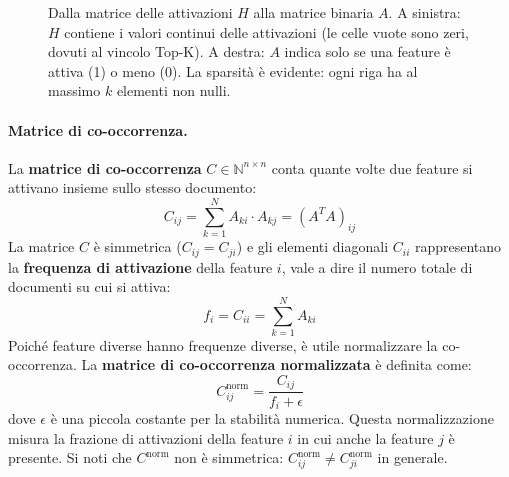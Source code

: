\begin{figure}[htbp]
    \caption{Dalla matrice delle attivazioni $H$ alla matrice binaria $A$. A sinistra: $H$ contiene i valori continui delle attivazioni (le celle vuote sono zeri, dovuti al vincolo Top-K). A destra: $A$ indica solo se una feature è attiva (1) o meno (0). La sparsità è evidente: ogni riga ha al massimo $k$ elementi non nulli.}
    \label{fig:H_to_A}
\end{figure}

\paragraph{Matrice di co-occorrenza.} La \textbf{matrice di co-occorrenza} $C \in \mathbb{N}^{n \times n}$ conta quante volte due feature si attivano insieme sullo stesso documento:
\begin{equation}
    C_{ij} = \sum_{k=1}^{N} A_{ki} \cdot A_{kj} = \left( A^T A \right)_{ij}
    \label{eq:cooccurrence}
\end{equation}
La matrice $C$ è simmetrica ($C_{ij} = C_{ji}$) e gli elementi diagonali $C_{ii}$ rappresentano la \textbf{frequenza di attivazione} della feature $i$, vale a dire il numero totale di documenti su cui si attiva:
\begin{equation}
    f_i = C_{ii} = \sum_{k=1}^{N} A_{ki}
    \label{eq:activation_frequency}
\end{equation}
Poiché feature diverse hanno frequenze diverse, è utile normalizzare la co-occorrenza. La \textbf{matrice di co-occorrenza normalizzata} è definita come:
\begin{equation}
    C^{\text{norm}}_{ij} = \frac{C_{ij}}{f_i + \epsilon}
    \label{eq:cooccurrence_norm}
\end{equation}
dove $\epsilon$ è una piccola costante per la stabilità numerica. Questa normalizzazione misura la frazione di attivazioni della feature $i$ in cui anche la feature $j$ è presente. Si noti che $C^{\text{norm}}$ non è simmetrica: $C^{\text{norm}}_{ij} \neq C^{\text{norm}}_{ji}$ in generale.
